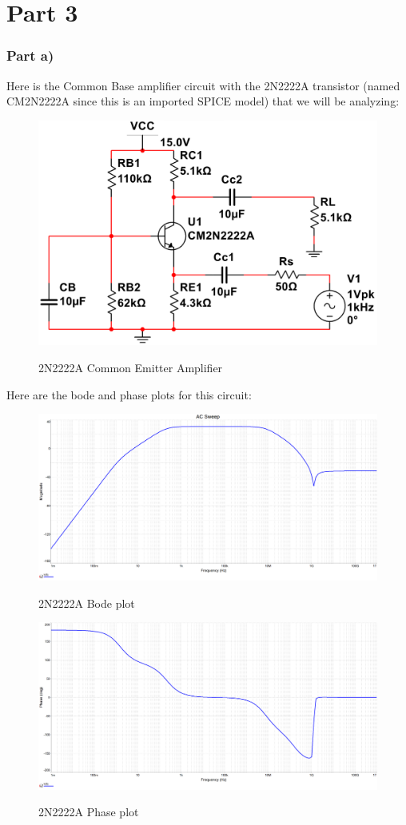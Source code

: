 \documentclass[12pt]{article}
\begin{document}
\section{Part 3}
\subsubsection{Part a)}
Here is the Common Base amplifier circuit with the 2N2222A transistor (named CM2N2222A since this is an imported SPICE model) that we will be analyzing:
\begin{figure}[H]
\centering
\includegraphics[height=0.40\textwidth]{Images/3acircuit.png}\\
\caption{2N2222A Common Emitter Amplifier}
\label{fig:part3_circuit}
\end{figure}
Here are the bode and phase plots for this circuit:

\begin{figure}[H]
\centering
\includegraphics[height=0.45\textwidth]{Images/part3_bode.png}\\
\caption{2N2222A Bode plot}
\label{fig:part3_bodeplot}
\end{figure}
\begin{figure}[H]
\centering
\includegraphics[height=0.45\textwidth]{Images/part3_phase.png}\\
\caption{2N2222A Phase plot}
\label{fig:part3_phaseplot}
\end{figure}
\end{document}
